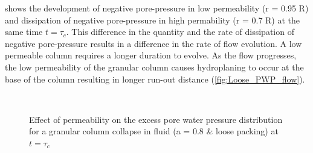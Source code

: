 shows the development of negative pore-pressure in low 
permeability (r = 0.95 R) and dissipation of negative pore-pressure in high 
permability (r = 0.7 R) at the same time $ t = \tau_c$. This difference in the 
quantity and the rate of dissipation of negative pore-pressure results in 
a difference in the rate of flow evolution. A low permeable column requires a 
longer 
duration to evolve. As the flow progresses, the low permeability of 
the granular column causes hydroplaning to occur at the base of the column 
resulting in longer run-out distance (\cref{fig:Loose_PWP_flow}).
\begin{figure}
\centering
{}\\
\caption{Effect of permeability on the excess pore water pressure distribution 
for a granular column collapse in fluid (a = 0.8 \& loose packing) at $t = 
\tau_c$}
\label{fig:Loose_PWP_ini}
\end{figure}

